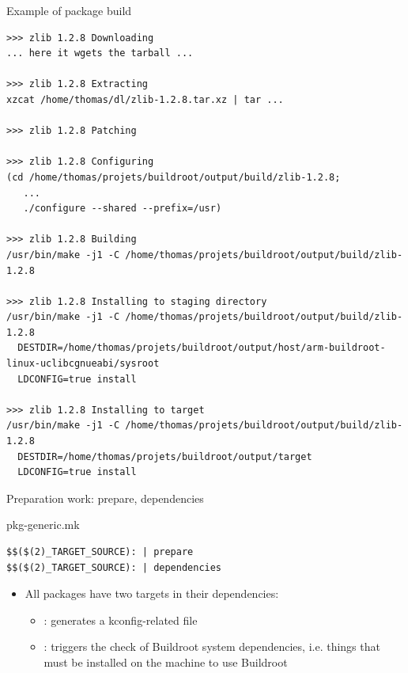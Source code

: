 \begin{frame}[fragile]{Example of package build}

\tiny
\begin{verbatim}
>>> zlib 1.2.8 Downloading
... here it wgets the tarball ...

>>> zlib 1.2.8 Extracting
xzcat /home/thomas/dl/zlib-1.2.8.tar.xz | tar ...

>>> zlib 1.2.8 Patching

>>> zlib 1.2.8 Configuring
(cd /home/thomas/projets/buildroot/output/build/zlib-1.2.8;
   ...
   ./configure --shared --prefix=/usr)

>>> zlib 1.2.8 Building
/usr/bin/make -j1 -C /home/thomas/projets/buildroot/output/build/zlib-1.2.8

>>> zlib 1.2.8 Installing to staging directory
/usr/bin/make -j1 -C /home/thomas/projets/buildroot/output/build/zlib-1.2.8
  DESTDIR=/home/thomas/projets/buildroot/output/host/arm-buildroot-linux-uclibcgnueabi/sysroot
  LDCONFIG=true install

>>> zlib 1.2.8 Installing to target
/usr/bin/make -j1 -C /home/thomas/projets/buildroot/output/build/zlib-1.2.8
  DESTDIR=/home/thomas/projets/buildroot/output/target
  LDCONFIG=true install
\end{verbatim}
\end{frame}

\begin{frame}[fragile]{Preparation work: prepare, dependencies}

  \begin{block}{pkg-generic.mk}
    \begin{verbatim}
$$($(2)_TARGET_SOURCE): | prepare
$$($(2)_TARGET_SOURCE): | dependencies
    \end{verbatim}
  \end{block}

  \begin{itemize}
  \item All packages have two targets in their dependencies:
    \begin{itemize}
    \item {}: generates a kconfig-related 
      file
    \item {}: triggers the check of Buildroot system
      dependencies, i.e. things that must be installed on the machine
      to use Buildroot
    \end{itemize}
  \end{itemize}
\end{frame}

